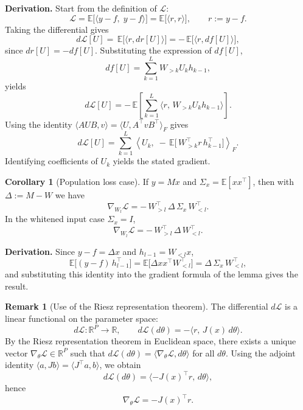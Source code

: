 \documentclass{article}
\theoremstyle{definition}
\newtheorem{corollary}[theorem]{Corollary}
\newtheorem{remark}[theorem]{Remark}
\begin{document}
\noindent\textbf{Derivation.}
Start from the definition of $\mathcal{L}$:
\[
\mathcal{L} = \mathbb{E}\!\big[\langle y-f,\;y-f\rangle\big]
= \mathbb{E}\!\big[\langle r,r\rangle\big],
\qquad r := y-f.
\]
Taking the differential gives
\[
d\mathcal{L}[U]
= \,\mathbb{E}\!\big[\langle r,dr[U]\rangle\big]
= -\,\mathbb{E}\!\big[\langle r,df[U]\rangle\big],
\]
since $dr[U] = -df[U]$.
Substituting the expression of $df[U]$,
\[
df[U] = \sum_{k=1}^L W_{>k} U_k h_{k-1},
\]
yields
\[
d\mathcal{L}[U]
= -\,\mathbb{E}\!\left[\sum_{k=1}^L
\langle r,\,W_{>k}U_k h_{k-1}\rangle\right].
\]
Using the identity
$\langle AUB,v\rangle = \langle U, A^{\top}vB^{\top}\rangle_F$
gives
\[
d\mathcal{L}[U]
= \sum_{k=1}^L
\left\langle U_k,\;
-\,\mathbb{E}\!\big[\,W_{>k}^{\top}r\,h_{k-1}^{\top}\big]
\right\rangle_F.
\]
Identifying coefficients of $U_k$ yields the stated gradient.

\begin{corollary}[Population loss case]
If $y = Mx$ and $\Sigma_x = \mathbb{E}[xx^\top]$, then with $\Delta := M - W$ we have
\[
\boxed{
\nabla_{W_l}\mathcal{L}
= -\,W_{>l}^{\top}\,\Delta\,\Sigma_x\,W_{<l}^{\top}.
}
\]
In the whitened input case $\Sigma_x = I$,
\[
\boxed{
\nabla_{W_l}\mathcal{L}
= -\,W_{>l}^{\top}\,\Delta\,W_{<l}^{\top}.
}
\]
\end{corollary}

\noindent\textbf{Derivation.}
Since $y-f = \Delta x$ and $h_{l-1}=W_{<l}x$,
\[
\mathbb{E}\!\big[(y-f)\,h_{l-1}^{\top}\big]
= \mathbb{E}\!\big[\Delta x x^{\top} W_{<l}^{\top}\big]
= \Delta\,\Sigma_x\,W_{<l}^{\top},
\]
and substituting this identity into the gradient formula of the lemma gives the result.
\begin{remark}[Use of the Riesz representation theorem]
The differential $d\mathcal{L}$ is a linear functional on the parameter space:
\[
d\mathcal{L}: \mathbb{R}^P \to \mathbb{R}, \qquad 
d\mathcal{L}(d\theta) = -\langle r,\,J(x)\,d\theta\rangle.
\]
By the Riesz representation theorem in Euclidean space, there exists a unique vector 
$\nabla_\theta \mathcal{L}\in\mathbb{R}^P$ such that 
$d\mathcal{L}(d\theta)=\langle \nabla_\theta \mathcal{L}, d\theta\rangle$ for all $d\theta$.
Using the adjoint identity $\langle a, Jb\rangle=\langle J^\top a, b\rangle$, we obtain
\[
d\mathcal{L}(d\theta)
= \langle -J(x)^\top r,\,d\theta\rangle,
\]
hence
\[
\boxed{\;\nabla_\theta \mathcal{L} = -J(x)^\top r.\;}
\]
\end{remark}
\end{document}
